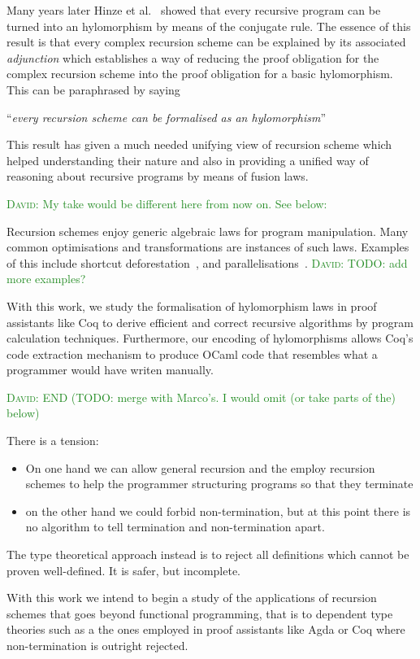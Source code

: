 \documentclass[anonymous, a4paper, UKenglish, cleveref, autoref, thm-restate]{lipics-v2021}
\newcommand{\dcas}[1]{\textcolor{ForestGreen}{\textsc{David}: #1}}
\begin{document}
Many years later Hinze et al.~\cite{HinzeWG15} showed that every recursive
program can be turned into an hylomorphism by means of the conjugate rule. The
essence of this result is that every complex recursion scheme can be explained
by its associated \emph{adjunction} which establishes a way of reducing the
proof obligation for the complex recursion scheme into the proof obligation for
a basic hylomorphism. This can be paraphrased by saying
\begin{center}
  ``\emph{every recursion scheme can be formalised as an hylomorphism}''
\end{center}

This result has given a much needed unifying view of recursion scheme which
helped understanding their nature and also in providing a unified way of
reasoning about recursive programs by means of fusion laws.

\dcas{My take would be different here from now on. See below:}

Recursion schemes enjoy generic algebraic laws for program manipulation. Many
common optimisations and transformations are instances of such laws. Examples of
this include shortcut deforestation~\cite{TakanoM95}, and
parallelisations~\cite{Gibbons96:Third}. \dcas{TODO: add more examples?}

With this work, we study the formalisation of hylomorphism laws in proof
assistants like Coq to derive efficient and correct recursive algorithms by
program calculation techniques. Furthermore, our encoding of hylomorphisms
allows Coq's code extraction mechanism to produce OCaml code that resembles what
a programmer would have writen manually.

\dcas{END (TODO: merge with Marco's. I would omit (or take parts of the) below)}

There is a tension:
\begin{itemize}
  \item On one hand we can allow general recursion and the employ recursion
schemes to help the programmer structuring programs so that they terminate
  \item on the other hand we could forbid non-termination, but at this point
there is no algorithm to tell termination and non-termination apart.
\end{itemize}

The type theoretical approach instead is to reject all definitions which cannot
be proven well-defined. It is safer, but incomplete.

With this work we intend to begin a study of the applications of recursion
schemes that goes beyond functional programming, that is to dependent type
theories such as a the ones employed in proof assistants like Agda or Coq where
non-termination is outright rejected.
\end{document}
